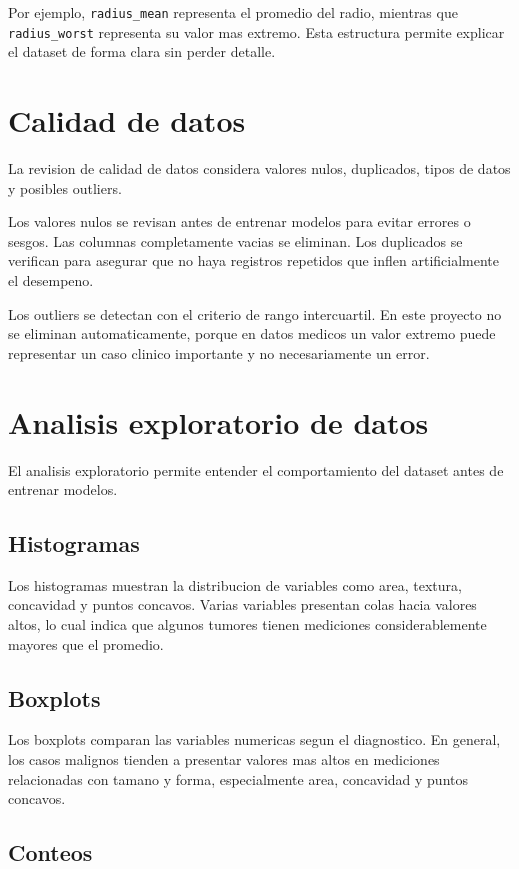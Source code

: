 \documentclass[12pt,letterpaper]{article}
\begin{document}
Por ejemplo, \texttt{radius\_mean} representa el promedio del radio, mientras que \texttt{radius\_worst} representa su valor mas extremo. Esta estructura permite explicar el dataset de forma clara sin perder detalle.

\section{Calidad de datos}

La revision de calidad de datos considera valores nulos, duplicados, tipos de datos y posibles outliers.

Los valores nulos se revisan antes de entrenar modelos para evitar errores o sesgos. Las columnas completamente vacias se eliminan. Los duplicados se verifican para asegurar que no haya registros repetidos que inflen artificialmente el desempeno.

Los outliers se detectan con el criterio de rango intercuartil. En este proyecto no se eliminan automaticamente, porque en datos medicos un valor extremo puede representar un caso clinico importante y no necesariamente un error.

\section{Analisis exploratorio de datos}

El analisis exploratorio permite entender el comportamiento del dataset antes de entrenar modelos.

\subsection{Histogramas}

Los histogramas muestran la distribucion de variables como area, textura, concavidad y puntos concavos. Varias variables presentan colas hacia valores altos, lo cual indica que algunos tumores tienen mediciones considerablemente mayores que el promedio.

\subsection{Boxplots}

Los boxplots comparan las variables numericas segun el diagnostico. En general, los casos malignos tienden a presentar valores mas altos en mediciones relacionadas con tamano y forma, especialmente area, concavidad y puntos concavos.

\subsection{Conteos}
\end{document}
